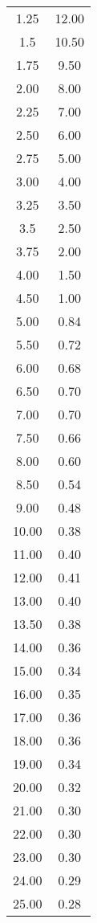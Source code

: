 \begin{table}[!htp]
\begin{tabular}{c c}
 1.25    & 12.00 \\
 1.5     & 10.50 \\
1.75     & 9.50 \\
2.00     & 8.00 \\
2.25     & 7.00 \\
2.50     & 6.00 \\
2.75     & 5.00 \\
3.00     & 4.00 \\
3.25     & 3.50 \\
3.5      & 2.50 \\
3.75     & 2.00 \\
4.00     & 1.50 \\
4.50     & 1.00 \\
5.00     & 0.84 \\
5.50     & 0.72 \\
6.00     & 0.68 \\
6.50     & 0.70 \\
7.00     & 0.70 \\
7.50     & 0.66 \\
8.00     & 0.60 \\
8.50     & 0.54 \\
9.00     & 0.48 \\
10.00    & 0.38 \\
11.00    & 0.40 \\
12.00    & 0.41 \\
13.00    & 0.40 \\
13.50    & 0.38 \\
14.00    & 0.36 \\
15.00    & 0.34 \\
16.00    & 0.35 \\
17.00    & 0.36 \\
18.00    & 0.36 \\
19.00    & 0.34 \\
20.00    & 0.32 \\
21.00    & 0.30 \\
22.00    & 0.30 \\
23.00    & 0.30 \\
24.00    & 0.29 \\
25.00    & 0.28 \\
\bottomrule
\end{tabular}
\end{table}